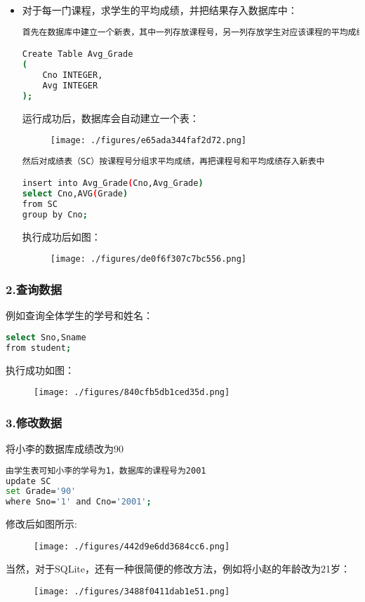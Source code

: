 \begin{itemize}
\item 对于每一门课程，求学生的平均成绩，并把结果存入数据库中：
\begin{lstlisting}[language=bash]
首先在数据库中建立一个新表，其中一列存放课程号，另一列存放学生对应该课程的平均成绩

Create Table Avg_Grade
(
    Cno INTEGER,
    Avg INTEGER
);

\end{lstlisting}
运行成功后，数据库会自动建立一个表：
\begin{figure}[ht]
\centering
\texttt{[image: ./figures/e65ada344faf2d72.png]}
\caption{} \label{fig_SQLint_18}
\end{figure}

\begin{lstlisting}[language=bash]
然后对成绩表（SC）按课程号分组求平均成绩，再把课程号和平均成绩存入新表中

insert into Avg_Grade(Cno,Avg_Grade)
select Cno,AVG(Grade)
from SC
group by Cno;
\end{lstlisting}
执行成功后如图：
\begin{figure}[ht]
\centering
\texttt{[image: ./figures/de0f6f307c7bc556.png]}
\caption{} \label{fig_SQLint_19}
\end{figure}
\end{itemize}





\subsubsection{2.查询数据}
例如查询全体学生的学号和姓名：
\begin{lstlisting}[language=bash]
select Sno,Sname
from student;
\end{lstlisting}

执行成功如图：
\begin{figure}[ht]
\centering
\texttt{[image: ./figures/840cfb5db1ced35d.png]}
\caption{} \label{fig_SQLint_14}
\end{figure}

\subsubsection{3.修改数据}
将小李的数据库成绩改为90
\begin{lstlisting}[language=bash]
由学生表可知小李的学号为1，数据库的课程号为2001
update SC
set Grade='90'
where Sno='1' and Cno='2001';
\end{lstlisting}
修改后如图所示:
\begin{figure}[ht]
\centering
\texttt{[image: ./figures/442d9e6dd3684cc6.png]}
\caption{} \label{fig_SQLint_15}
\end{figure}
当然，对于SQLite，还有一种很简便的修改方法，例如将小赵的年龄改为21岁：
\begin{figure}[ht]
\centering
\texttt{[image: ./figures/3488f0411dab1e51.png]}
\caption{} \label{fig_SQLint_16}
\end{figure}




